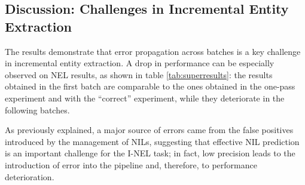 \subsection{Discussion: Challenges in Incremental Entity Extraction} \label{sec:futures}
The results demonstrate that error propagation across batches is a key challenge in incremental entity extraction. A drop in performance can be especially observed on NEL results, as shown in table \ref{tab:superresults}: the results obtained in the first batch are comparable to the ones obtained in the one-pass experiment and with the ``correct'' experiment, while they deteriorate in the following batches.





As previously explained, a major source of errors came from the false positives introduced by the management of NILs, suggesting that effective NIL prediction is an important challenge for the I-NEL task; in fact, low precision leads to the introduction of error into the pipeline and, therefore, to performance deterioration. %


